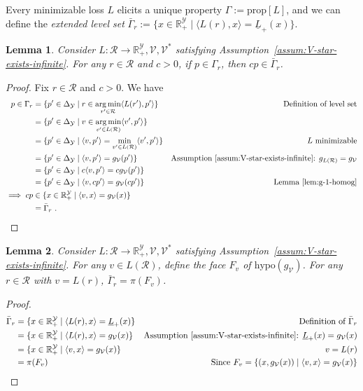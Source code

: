 \documentclass[11pt]{article}
\newcommand{\reals}{\mathbb{R}}
\newcommand{\prop}[1]{\mathrm{prop}[#1]}
\newcommand{\simplex}{\Delta_\Y}
\newcommand{\R}{\mathcal{R}}
\newcommand{\V}{\mathcal{V}}
\newcommand{\Y}{\mathcal{Y}}
\newcommand{\risk}[1]{\underline{#1}}
\newcommand{\inprod}[2]{\langle #1, #2 \rangle}%
\newcommand{\hyp}{\mathrm{hypo}}
\DeclareMathOperator*{\argmin}{arg\,min}
\newtheorem{lemma}{Lemma}
\begin{document}
Every minimizable loss $L$ elicits a unique property $\Gamma := \prop{L}$, and we can define the \emph{extended level set} $\bar \Gamma_r := \{x \in \reals^\Y_+ \mid \inprod{L(r)}{x} = \risk L_+(x)\}$.

\begin{lemma}\label{lem:levelset-to-extended-levelset}
	Consider $L: \R \to \reals^\Y_+,\V, \V^*$ satisfying Assumption~\ref{assum:V-star-exists-infinite}.
	For any $r \in \R$ and $c > 0$, if $p \in \Gamma_r$, then $cp \in \bar \Gamma_r$. 
\end{lemma}
\begin{proof}
	Fix $r \in \R$ and $c > 0$.
	We have
	\begin{align*}
	p \in \Gamma_r
	&= \{p' \in \simplex \mid r \in \argmin_{r' \in \R} \inprod{L(r')}{p'} \} & \text {Definition of level set} \\
	&= \{p' \in \simplex \mid v \in \argmin_{v' \in L(\R)} \inprod{v'}{p'} \} &  \\
	&= \{p' \in \simplex \mid \inprod{v}{p'} = \min_{v' \in L(\R)} \inprod{v'}{p'} \} & \text {$L$ minimizable} \\
	&= \{p' \in \simplex \mid \inprod{v}{p'} = g_\V(p') \} & \text {Assumption~\ref{assum:V-star-exists-infinite}: $g_{L(\R)} = g_\V$} \\
	&= \{p' \in \simplex \mid c \inprod{v}{p'} = c g_\V(p') \} &  \\
	&= \{p' \in \simplex \mid  \inprod{v}{cp'} = g_\V(cp') \} & \text {Lemma~\ref{lem:g-1-homog}} \\
	\implies cp
	&\in \{x \in \reals^\Y_+ \mid \inprod{v}{x} = g_\V(x)\}\\
	&= \bar \Gamma_r~.~
	\end{align*}
\end{proof}

\begin{lemma}\label{lem:extended-levelset-equals-projected-face}
	Consider $L : \R \to \reals^\Y_+, \V, \V^*$ satisfying Assumption~\ref{assum:V-star-exists-infinite}.
	For any $v \in L(\R)$, define the face $F_v$ of $\hyp(g_\V)$.
	For any $r\in \R$ with $v = L(r)$, $\bar \Gamma_r = \pi(F_v)$.  
\end{lemma}
\begin{proof}
	\begin{align*}
	\bar \Gamma_r
	&= \{x \in \reals^\Y_+ \mid \inprod{L(r)}{x} = \risk L_+(x)\} & \text{Definition of $\bar \Gamma_r$}\\
	&= \{x \in \reals^\Y_+ \mid \inprod{L(r)}{x} = g_\V(x)\} & \text{Assumption~\ref{assum:V-star-exists-infinite}: $\risk L_+(x) = g_\V(x)$}\\
	&= \{x \in \reals^\Y_+ \mid \inprod{v}{x} = g_\V(x)\} & \text{$v = L(r)$}\\
	&= \pi(F_v) & \text{Since $F_v = \{(x,g_\V(x)) \mid \inprod{v}{x} = g_\V(x)\}$}\\
	\end{align*}
\end{proof}
\end{document}
